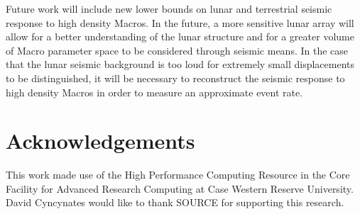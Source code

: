 \documentclass[prd,reprint,10pt]{revtex4-1}
\begin{document}
Future work will include new lower bounds on lunar and terrestrial seismic response to high density Macros. In the future, a more sensitive lunar array will allow for a better understanding of the lunar structure and for a greater volume of Macro parameter space to be considered through seismic means. In the case that the lunar seismic background is too loud for extremely small displacements to be distinguished, it will be necessary to reconstruct the seismic response to high density Macros in order to measure an approximate event rate.
\section{Acknowledgements}
This work made use of the High Performance Computing Resource in the Core Facility for Advanced Research Computing at Case Western Reserve University. David Cyncynates would like to thank SOURCE for supporting this research.
{}

\end{document}
